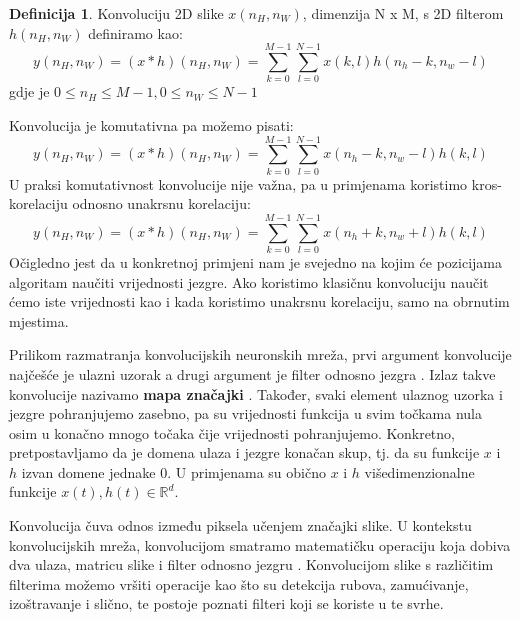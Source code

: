 \documentclass[times, utf8, diplomski]{fer}
\theoremstyle{definition}
\newtheorem{definition}{Definicija}[section]
\begin{document}
\begin{definition}
Konvoluciju 2D slike $x(n_H, n_W)$, dimenzija N x M, s 2D filterom $h(n_H, n_W)$ definiramo kao:
\begin{equation}
y(n_H, n_W) = (x * h) (n_H, n_W) = \sum_{k = 0 }^{M-1}\sum_{l=0}^{N-1}x(k,l)h(n_h-k, n_w-l)
\end{equation}
gdje je $0\le n_H \le M-1, 0\le n_W \le N - 1$
\end{definition}
Konvolucija je komutativna pa možemo pisati:
\begin{equation}
y(n_H, n_W) = (x * h) (n_H, n_W) = \sum_{k = 0 }^{M-1}\sum_{l=0}^{N-1}x(n_h -k, n_w - l)h(k, l)
\end{equation}
U praksi komutativnost konvolucije nije važna, pa u primjenama koristimo kros-korelaciju  odnosno unakrsnu korelaciju:
\begin{equation}
y(n_H, n_W) = (x * h) (n_H, n_W) = \sum_{k = 0 }^{M-1}\sum_{l=0}^{N-1}x(n_h + k, n_w + l)h(k, l)
\end{equation}
Očigledno jest da u konkretnoj primjeni nam je svejedno na kojim će pozicijama algoritam naučiti vrijednosti jezgre. Ako koristimo klasičnu konvoluciju naučit ćemo iste vrijednosti kao i kada koristimo unakrsnu korelaciju, samo na obrnutim mjestima.

Prilikom razmatranja konvolucijskih neuronskih mreža, prvi argument konvolucije najčešće je ulazni uzorak a drugi argument je filter odnosno jezgra . Izlaz takve konvolucije nazivamo \textbf{mapa značajki} . Također, svaki element ulaznog uzorka i jezgre pohranjujemo zasebno, pa su vrijednosti funkcija u svim točkama nula osim u konačno mnogo točaka čije vrijednosti pohranjujemo. Konkretno, pretpostavljamo da je domena ulaza i jezgre konačan skup, tj. da su funkcije $x$ i $h$ izvan domene jednake 0. U primjenama su obično $x$ i $h$ višedimenzionalne funkcije $x(t), h(t) \in \mathbb{R}^d. $

Konvolucija čuva odnos između piksela učenjem značajki slike. U kontekstu konvolucijskih mreža, konvolucijom smatramo matematičku operaciju koja dobiva dva ulaza, matricu slike i filter odnosno jezgru . Konvolucijom slike s različitim filterima možemo vršiti operacije kao što su detekcija rubova, zamućivanje, izoštravanje i slično, te postoje poznati filteri koji se koriste u te svrhe.
\end{document}

